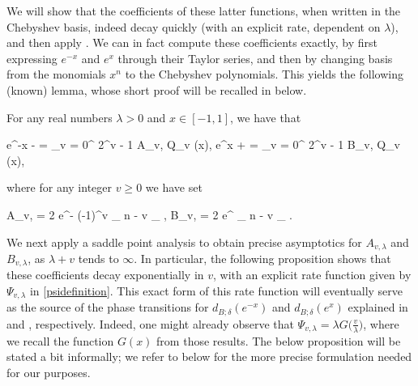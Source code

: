 	We will show that the coefficients of these latter functions, when written in the Chebyshev basis, indeed decay quickly (with an explicit rate, dependent on $\lambda$), and then apply . We can in fact compute these coefficients exactly, by first expressing $e^{-x}$ and $e^x$ through their Taylor series, and then by changing basis from the monomials $x^n$ to the Chebyshev polynomials. This yields the following (known) lemma, whose short proof will be recalled in  below.
    		
	
	\begin{lemma} 
		
	\label{amlambda}
	
	For any real numbers $\lambda > 0$ and $x \in [-1, 1]$, we have that 
	\begin{flalign}
	\label{absum} 
	e^{-\lambda x - \lambda} = \displaystyle\sum_{v = 0}^{\infty} 2^{v - 1} A_{v, \lambda} Q_v (x), \qquad e^{\lambda x + \lambda} = \displaystyle\sum_{v = 0}^{\infty} 2^{v - 1} B_{v, \lambda} Q_v (x),
	\end{flalign}
	
	\noindent where for any integer $v \ge 0$ we have set 
	\begin{flalign}
	\label{avlambdadefinition}
	A_{v, \lambda} = 2 e^{-\lambda} (-1)^v \displaystyle\sum_{ n - v  _{}} \displaystyle{} , \qquad B_{v, \lambda} = 2 e^{\lambda} \displaystyle\sum_{ n - v  _{}} \displaystyle{} \binom{n}{\frac{n - v}{2}}.
	\end{flalign}
	
		
	\end{lemma} 
	

    We next apply a saddle point analysis to obtain precise asymptotics for $A_{v, \lambda}$ and $B_{v, \lambda}$, as $\lambda + v$ tends to $\infty$. In particular, the following proposition shows that these coefficients decay exponentially in $v$, with an explicit rate function given by $\Psi_{v, \lambda}$ in \eqref{psidefinition}. This exact form of this rate function will eventually serve as the source of the phase transitions for $d_{B; \delta} (e^{-x})$ and $d_{B; \delta} (e^x)$ explained in  and , respectively. Indeed, one might already observe that $\Psi_{v, \lambda} = \lambda G \big( \frac{v}{\lambda} \big)$, where we recall the function $G(x)$ from those results. The below proposition will be stated a bit informally; we refer to  below for the more precise formulation needed for our purposes.
	
